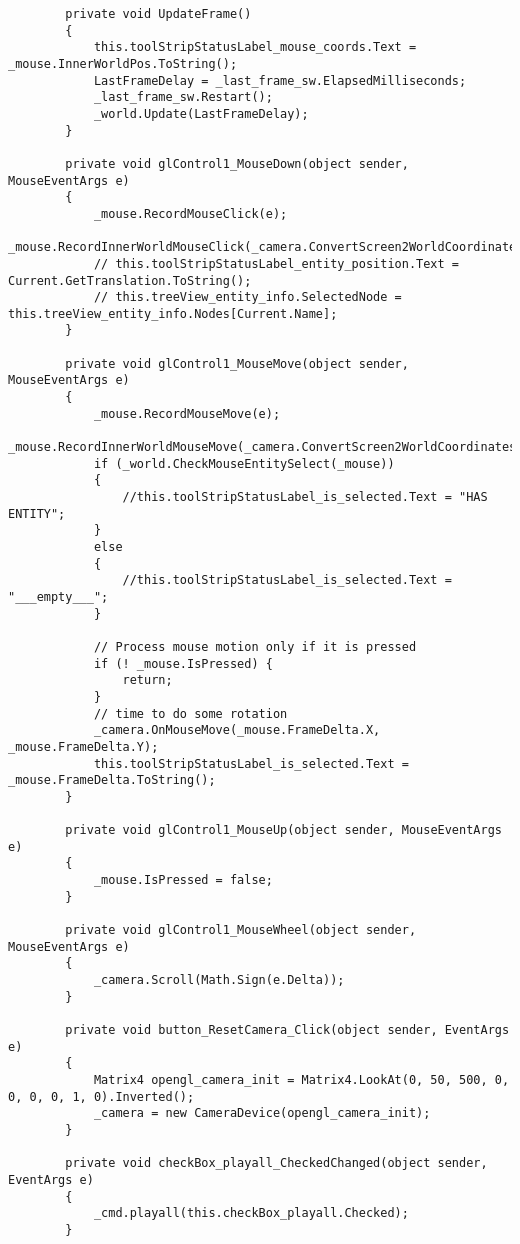 \begin{scriptsize}
\begin{verbatim}
        private void UpdateFrame()
        {          
            this.toolStripStatusLabel_mouse_coords.Text = _mouse.InnerWorldPos.ToString();
            LastFrameDelay = _last_frame_sw.ElapsedMilliseconds;
            _last_frame_sw.Restart();
            _world.Update(LastFrameDelay);
        }

        private void glControl1_MouseDown(object sender, MouseEventArgs e)
        {
            _mouse.RecordMouseClick(e);
            _mouse.RecordInnerWorldMouseClick(_camera.ConvertScreen2WorldCoordinates(_mouse.ClickPos));
            // this.toolStripStatusLabel_entity_position.Text = Current.GetTranslation.ToString();
            // this.treeView_entity_info.SelectedNode = this.treeView_entity_info.Nodes[Current.Name];
        }

        private void glControl1_MouseMove(object sender, MouseEventArgs e)
        {
            _mouse.RecordMouseMove(e);
            _mouse.RecordInnerWorldMouseMove(_camera.ConvertScreen2WorldCoordinates(_mouse.CurrentPos));
            if (_world.CheckMouseEntitySelect(_mouse))
            {
                //this.toolStripStatusLabel_is_selected.Text = "HAS ENTITY";
            }
            else
            {
                //this.toolStripStatusLabel_is_selected.Text = "___empty___";
            }

            // Process mouse motion only if it is pressed
            if (! _mouse.IsPressed) {
                return;
            }
            // time to do some rotation
            _camera.OnMouseMove(_mouse.FrameDelta.X, _mouse.FrameDelta.Y);
            this.toolStripStatusLabel_is_selected.Text = _mouse.FrameDelta.ToString();
        }

        private void glControl1_MouseUp(object sender, MouseEventArgs e)
        {
            _mouse.IsPressed = false;
        }

        private void glControl1_MouseWheel(object sender, MouseEventArgs e)
        {
            _camera.Scroll(Math.Sign(e.Delta));
        }

        private void button_ResetCamera_Click(object sender, EventArgs e)
        {
            Matrix4 opengl_camera_init = Matrix4.LookAt(0, 50, 500, 0, 0, 0, 0, 1, 0).Inverted();
            _camera = new CameraDevice(opengl_camera_init);
        }

        private void checkBox_playall_CheckedChanged(object sender, EventArgs e)
        {
            _cmd.playall(this.checkBox_playall.Checked);
        }


\end{verbatim}
\end{scriptsize}
